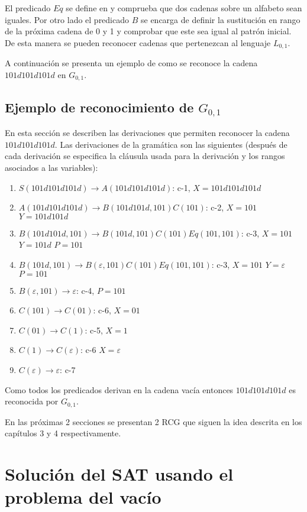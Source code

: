 \documentclass[12pt]{article}
\begin{document}
El predicado $Eq$ se define en \cite{mainRCGBib} y comprueba que dos cadenas sobre un alfabeto sean iguales.
Por otro lado el predicado $B$ se encarga de definir la sustitución en rango de la próxima cadena de 0 y 1 y
comprobar que este sea igual al patrón inicial. De esta manera se pueden reconocer cadenas que pertenezcan al lenguaje $L_{0,1}$.

A continuación se presenta un ejemplo de como se reconoce la cadena $101d101d101d$ en $G_{0,1}$.

\subsection{Ejemplo de reconocimiento de $G_{0,1}$}

En esta sección se describen las derivaciones que permiten reconocer la cadena $101d101d101d$. Las derivaciones
de la gramática son las siguientes (después de cada derivación se especifica la cláusula
usada para la derivación y los rangos asociados a las variables):

\begin{enumerate}
    \item $S(101d101d101d) \to A(101d101d101d)$: c-1, $X=101d101d101d$
    \item $A(101d101d101d) \to B(101d101d,101)C(101)$: c-2, $X=101$ $Y=101d101d$
    \item $B(101d101d,101) \to B(101d,101)C(101)Eq(101,101)$: c-3, $X=101$ $Y=101d$ $P=101$
    \item $B(101d,101) \to B(\varepsilon,101)C(101)Eq(101,101)$: c-3, $X=101$ $Y=\varepsilon$ $P=101$
    \item $B(\varepsilon,101) \to \varepsilon$: c-4, $P=101$
    \item $C(101)\to C(01)$: c-6, $X=01$
    \item $C(01)\to C(1)$: c-5, $X=1$
    \item $C(1)\to C(\varepsilon)$: c-6 $X=\varepsilon$
    \item $C(\varepsilon)\to \varepsilon$: c-7
\end{enumerate}

Como todos los predicados derivan en la cadena vacía entonces $101d101d101d$ es reconocida por $G_{0,1}$.

En las próximas 2 secciones se presentan 2 RCG que siguen la idea descrita en los capítulos 3 y 4 respectivamente.

\section{Solución del SAT usando el problema del vacío}
\end{document}
